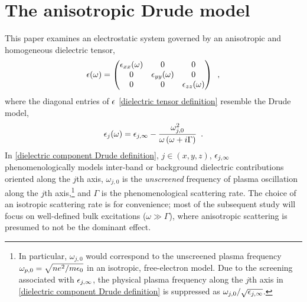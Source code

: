 \section{The anisotropic Drude model}

This paper examines an electrostatic system governed by an anisotropic and homogeneous dielectric tensor,
\begin{equation}
    \label{dielectric tensor definition}
    \epsilon(\omega) = \begin{pmatrix}
    \epsilon_{xx}(\omega) & 0 & 0
    \\ 0 & \epsilon_{yy}(\omega) & 0
    \\ 0 & 0 & \epsilon_{zz}(\omega)
    \end{pmatrix}
    \,\,\,,
\end{equation}
where the diagonal entries of $\epsilon$ \eqref{dielectric tensor definition} resemble the Drude model,
\begin{equation}
    \label{dielectric component Drude definition}
    \epsilon_j(\omega) = \epsilon_{j,\infty}-\frac{\omega_{j,0}^2}{\omega\left(\omega+i\Gamma\right)}\,\,\,.
\end{equation}
In \eqref{dielectric component Drude definition}, $j\in(x,y,z)$, $\epsilon_{j,\infty}$ phenomenologically models inter-band or background dielectric contributions oriented along the $j$th axis, $\omega_{j,0}$ is the {\it unscreened} frequency of plasma oscillation along the $j$th axis,\footnote{In particular, $\omega_{j,0}$ would correspond to the unscreened plasma frequency $\omega_{p,0}=\sqrt{ne^2/m\epsilon_0}$ in an isotropic, free-electron model.  Due to the screening associated with $\epsilon_{j,\infty}$, the physical plasma frequency along the $j$th axis in \eqref{dielectric component Drude definition} is suppressed as $\omega_{j,0}/\sqrt{\epsilon_{j,\infty}}$.} and $\Gamma$ is the phenomenological scattering rate.  The choice of an isotropic scattering rate is for convenience; most of the subsequent study will focus on well-defined bulk excitations ($\omega\gg\Gamma$), where anisotropic scattering is presumed to not be the dominant effect.




